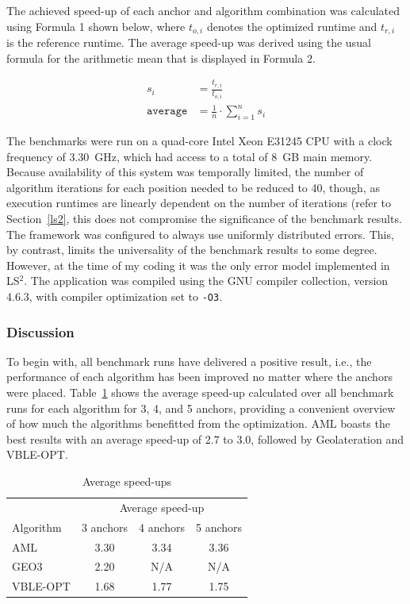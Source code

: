 The achieved speed-up of each anchor and algorithm combination was calculated using Formula 1 shown below, where $t_{o,i}$ denotes the optimized runtime and $t_{r,i}$ is the reference runtime. The average speed-up was derived using the usual formula for the arithmetic mean that is displayed in Formula 2.

\begin{align}
s_{i}& = \frac{t_{r,i}}{t_{o,i}} \\
\texttt{average}& = \frac{1}{n} \cdot \sum_{i = 1}^n s_{i}
\end{align}

The benchmarks were run on a quad-core Intel Xeon E31245 CPU with a clock frequency of 3.30~GHz, which had access to a total of 8~GB main memory. Because availability of this system was temporally limited, the number of algorithm iterations for each position needed to be reduced to 40, though, as execution runtimes are linearly dependent on the number of iterations (refer to Section~\ref{ls2}, this does not compromise the significance of the benchmark results. The framework was configured to always use uniformly distributed errors. This, by contrast, limits the universality of the benchmark results to some degree. However, at the time of my coding it was the only error model implemented in LS$^{2}$. The application was compiled using the GNU compiler collection, version 4.6.3, with compiler optimization set to \texttt{-O3}.

\subsubsection{Discussion}
To begin with, all benchmark runs have delivered a positive result, i.e., the performance of each algorithm has been improved no matter where the anchors were placed. Table~\ref{average_table} shows the average speed-up calculated over all benchmark runs for each algorithm for 3, 4, and 5 anchors, providing a convenient overview of how much the algorithms benefitted from the optimization. AML boasts the best results with an average speed-up of 2.7 to 3.0, followed by Geolateration and VBLE-OPT.

\begin{table}[ht]
\begin{center}
\caption{Average speed-ups}
\begin{tabular}{lccc} 
\toprule
& \multicolumn{3}{c}{Average speed-up} \\ 
\cmidrule(r){2-4}
Algorithm & 3 anchors & 4 anchors & 5 anchors \\
\midrule
AML & 3.30 & 3.34 & 3.36 \\
GEO3 & 2.20 & N/A & N/A \\ 
VBLE-OPT & 1.68 & 1.77& 1.75 \\
\bottomrule
\end{tabular}
\label{average_table}
\end{center}
\end{table}

